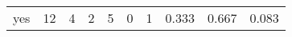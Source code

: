 \begin{longtable}{lp{1.3cm}p{1.3cm}p{1.3cm}p{1.3cm}p{1.3cm}p{1.3cm}p{1.3cm}p{1.3cm}p{1.3cm}}
yes       &                     12 &                                             4 &                                            2 &                                           5 &                                            0 &                                          1 &                                0.333 &                                  0.667 &                                0.083 \\
\end{longtable}
